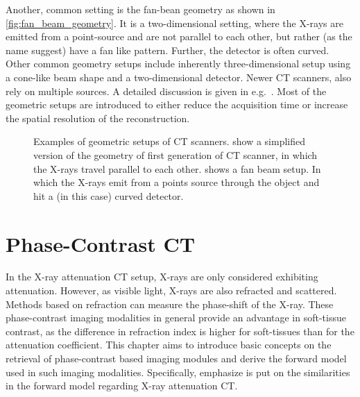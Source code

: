 Another, common setting is the fan-bean geometry as shown in \autoref{fig:fan_beam_geometry}. It is
a two-dimensional setting, where the X-rays are emitted from a point-source and are not parallel to
each other, but rather (as the name suggest) have a fan like pattern. Further, the detector is often
curved. Other common geometry setups include inherently three-dimensional setup using a cone-like
beam shape and a two-dimensional detector. Newer CT scanners, also rely on multiple sources. A
detailed discussion is given in e.g.\ \cite{buzug_computed_2008}. Most of the geometric setups are
introduced to either reduce the acquisition time or increase the spatial resolution of the
reconstruction.

\begin{figure}
	\centering
	\caption{Examples of geometric setups of CT scanners. 
		show a simplified version of the geometry of first generation of CT scanner, in
		which the X-rays travel parallel to each other.  shows
		a fan beam setup. In which the X-rays emit from a points source through the object
		and hit a (in this case) curved detector.}\label{fig:ct_geometry_setup}
\end{figure}

\section{Phase-Contrast CT}\label{sec:phasecontrast_ct}

In the X-ray attenuation CT setup, X-rays are only considered exhibiting attenuation. However, as
visible light, X-rays are also refracted and scattered. Methods based on refraction can measure the
phase-shift of the X-ray. These phase-contrast imaging modalities in general provide an advantage in
soft-tissue contrast, as the difference in refraction index is higher for soft-tissues than for the
attenuation coefficient. This chapter aims to introduce basic concepts on the retrieval of
phase-contrast based imaging modules and derive the forward model used in such imaging modalities.
Specifically, emphasize is put on the similarities in the forward model regarding X-ray attenuation
CT\@.

